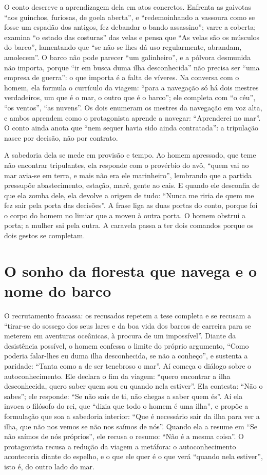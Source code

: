 \documentclass[12pt]{article}
\begin{document}
O conto descreve a aprendizagem dela em atos concretos. Enfrenta as gaivotas ``aos guinchos, furiosas, de goela aberta'', e ``redemoinhando a vassoura como se fosse um espadão dos antigos, fez debandar o bando assassino''; varre a coberta; examina ``o estado das costuras'' das velas e pensa que ``As velas são os músculos do barco'', lamentando que ``se não se lhes dá uso regularmente, abrandam, amolecem''. O barco não pode parecer ``um galinheiro'', e a pólvora desmunida não importa, porque ``ir em busca duma ilha desconhecida'' não precisa ser ``uma empresa de guerra'': o que importa é a falta de víveres. Na conversa com o homem, ela formula o currículo da viagem: ``para a navegação só há dois mestres verdadeiros, um que é o mar, o outro que é o barco''; ele completa com ``o céu'', ``os ventos'', ``as nuvens''. Os dois enumeram os mestres da navegação em voz alta, e ambos aprendem como o protagonista aprende a navegar: ``Aprenderei no mar''. O conto ainda anota que ``nem sequer havia sido ainda contratada'': a tripulação nasce por decisão, não por contrato.

A sabedoria dela se mede em provisão e tempo. Ao homem apressado, que teme não encontrar tripulantes, ela responde com o provérbio do avô, ``quem vai ao mar avia-se em terra, e mais não era ele marinheiro'', lembrando que a partida pressupõe abastecimento, estação, maré, gente ao cais. E quando ele desconfia de que ela zomba dele, ela devolve a origem de tudo: ``Nunca me riria de quem me fez sair pela porta das decisões''. A frase liga as duas portas do conto, porque foi o corpo do homem no limiar que a moveu à outra porta. O homem obstrui a porta; a mulher sai pela outra. A caravela passa a ter dois comandos porque os dois gestos se completam.

\section{O sonho da floresta que navega e o nome do barco}

O recrutamento fracassa: os recusados repetem a tese completa e se recusam a ``tirar-se do sossego dos seus lares e da boa vida dos barcos de carreira para se meterem em aventuras oceânicas, à procura de um impossível''. Diante da desistência possível, o homem confessa o limite do próprio argumento, ``Como poderia falar-lhes eu duma ilha desconhecida, se não a conheço'', e sustenta a paridade: ``Tanta como a de ser tenebroso o mar''. Aí começa o diálogo sobre o autoconhecimento. Ele declara o fim da viagem: ``quero encontrar a ilha desconhecida, quero saber quem sou eu quando nela estiver''. Ela contesta: ``Não o sabes''; ele responde: ``Se não sais de ti, não chegas a saber quem és''. Aí ela invoca o filósofo do rei, que ``dizia que todo o homem é uma ilha'', e propõe a formulação que soa a sabedoria interior: ``Que é necessário sair da ilha para ver a ilha, que não nos vemos se não nos saímos de nós''. Quando ela a resume em ``Se não saímos de nós próprios'', ele recusa o resumo: ``Não é a mesma coisa''. O protagonista recusa a redução da viagem a metáfora: o autoconhecimento aconteceria diante do espelho, e o que ele quer é o que verá ``quando nela estiver'', isto é, do outro lado do mar.
\end{document}
